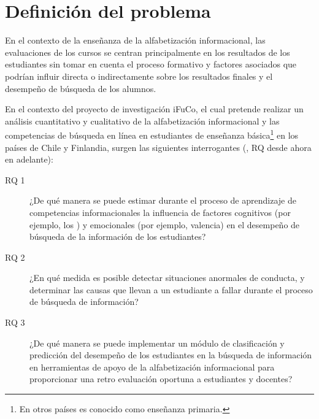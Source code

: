 \section{Definición del problema}
\label{sec:definicion_problema}
En el contexto de la enseñanza de la alfabetización informacional, las evaluaciones de los cursos se centran principalmente en los resultados de los estudiantes sin tomar en cuenta el proceso formativo y factores asociados que podrían influir directa o indirectamente sobre los resultados finales y el desempeño de búsqueda de los alumnos.  

En el contexto del proyecto de investigación iFuCo, el cual pretende realizar un análisis cuantitativo y cualitativo de la alfabetización informacional y las competencias de búsqueda en línea en estudiantes de enseñanza básica\footnote{En otros países es conocido como enseñanza primaria.} en los países de Chile y Finlandia, surgen las siguientes interrogantes (, RQ desde ahora en adelante):

\begin{description}
	\item [RQ 1] ¿De qué manera se puede estimar durante el proceso de aprendizaje de competencias informacionales la influencia de factores cognitivos (por ejemplo, los ) y emocionales (por ejemplo, valencia) en el desempeño de búsqueda de la información de los estudiantes?
	\item [RQ 2] ¿En qué medida es posible detectar situaciones anormales de conducta, y determinar las causas que llevan a un estudiante a fallar durante el proceso de búsqueda de información? 
	\item [RQ 3] ¿De qué manera se puede implementar un módulo de clasificación y predicción del desempeño de los estudiantes en la búsqueda de información en herramientas de apoyo de la alfabetización informacional para proporcionar una retro evaluación oportuna a estudiantes y docentes?
\end{description}
